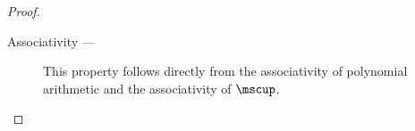 \begin{proposition}
\begin{proof}
\begin{description}



    \item[Associativity --- ]

      This property follows directly from the associativity of
      polynomial arithmetic and the associativity of $\mscup$.




\end{description}
\end{proof}
\end{proposition}
